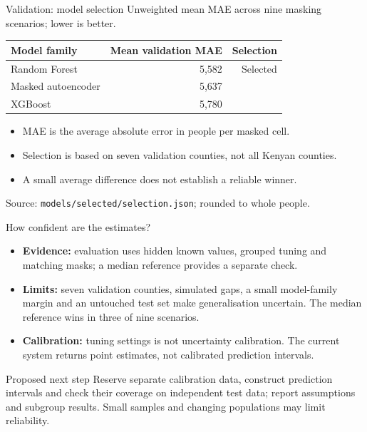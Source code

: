 \documentclass[aspectratio=169,11pt]{beamer}
\begin{document}
\begin{frame}{Validation: model selection}
  \small Unweighted mean MAE across nine masking scenarios; lower is better.
  \vspace{0.7em}
  \begin{center}
  \begin{tabular}{lrr}
    \toprule
    Model family & Mean validation MAE & Selection \\
    \midrule
    Random Forest & 5,582 & Selected \\
    Masked autoencoder & 5,637 & \\
    XGBoost & 5,780 & \\
    \bottomrule
  \end{tabular}
  \end{center}
  \begin{itemize}
    \item MAE is the average absolute error in people per masked cell.
    \item Selection is based on seven validation counties, not all Kenyan counties.
    \item A small average difference does not establish a reliable winner.
  \end{itemize}
  \tiny Source: \texttt{models/selected/selection.json}; rounded to whole people.
\end{frame}

\begin{frame}{How confident are the estimates?}
  \small
  \begin{itemize}
    \item \textbf{Evidence:} evaluation uses hidden known values, grouped tuning
    and matching masks; a median reference provides a separate check.
    \item \textbf{Limits:} seven validation counties, simulated gaps, a small
    model-family margin and an untouched test set make generalisation uncertain.
    The median reference wins in three of nine scenarios.
    \item \textbf{Calibration:} tuning settings is not uncertainty calibration.
    The current system returns point estimates, not calibrated prediction intervals.
  \end{itemize}
  \begin{block}{Proposed next step}
    Reserve separate calibration data, construct prediction intervals and check
    their coverage on independent test data; report assumptions and subgroup
    results. Small samples and changing populations may limit reliability.
  \end{block}
\end{frame}
\end{document}
